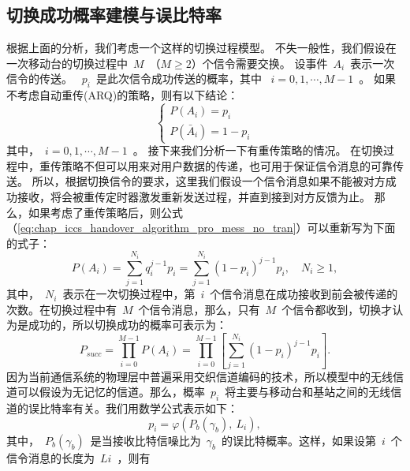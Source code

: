 \subsection{切换成功概率建模与误比特率}
根据上面的分析，我们考虑一个这样的切换过程模型。
不失一般性，我们假设在一次移动台的切换过程中~$M$~（$M \ge 2 $）个信令需要交换。
设事件~$A_i$~表示一次信令的传送。
 ~$p_i$~是此次信令成功传送的概率，其中 ~$i = 0,1, \cdots, M-1 $~。
如果不考虑自动重传(ARQ)的策略，则有以下结论：
\begin{equation}
\label{eq:chap_iccs_handover_algorithm_pro_mess_no_tran}
\begin{cases}
P(A_{i})=p_{i}\\
P(\bar{A}_{i})=1- p_{i}
\end{cases}
\end{equation}
其中，~$i=0,1,\cdots,M-1$~。
接下来我们分析一下有重传策略的情况。
在切换过程中，重传策略不但可以用来对用户数据的传递，也可用于保证信令消息的可靠传送。
所以，根据切换信令的要求，这里我们假设一个信令消息如果不能被对方成功接收，将会被重传定时器激发重新发送过程，并直到接到对方反馈为止。
那么，如果考虑了重传策略后，则公式 （\ref{eq:chap_iccs_handover_algorithm_pro_mess_no_tran}）可以重新写为下面的式子：
\begin{equation}
\label{eq:chap_iccs_handover_algorithm_Pro_basic01}
P(A_{i})=\sum_{j=1}^{N_{i}}q_{i}^{j-1}p_{i}=\sum_{j=1}^{N_{i}}
(1-p_{i})^{j-1}p_{i},\quad N_{i}\geq1,
\end{equation}
其中，~$N_i$~表示在一次切换过程中，第~$i$~个信令消息在成功接收到前会被传递的次数。在切换过程中有~$M$~个信令消息，那么，只有~$M$~个信令都收到，切换才认为是成功的，所以切换成功的概率可表示为：
\begin{equation}
\label{eq:chap_iccs_handover_algorithm_Pro_basic02}
P_{succ}=\prod_{i=0}^{M-1}P(A_{i})=\prod_{i=0}^{M-1}
\left[\sum_{j=1}^{N_{i}}(1-p_{i})^{j-1}p_{i}\right].
\end{equation}
因为当前通信系统的物理层中普遍采用交织信道编码的技术，所以模型中的无线信道可以假设为无记忆的信道。那么，概率~$p_i$~将主要与移动台和基站之间的无线信道的误比特率有关。我们用数学公式表示如下：
$$
p_{i}=\varphi(P_{b}(\gamma_{b}),\: L_{i}),
$$
其中，~$P_b(\gamma_b)$~是当接收比特信噪比为~$\gamma_b$~的误比特概率。这样，如果设第~$i$~个信令消息的长度为~$Li$~，则有
